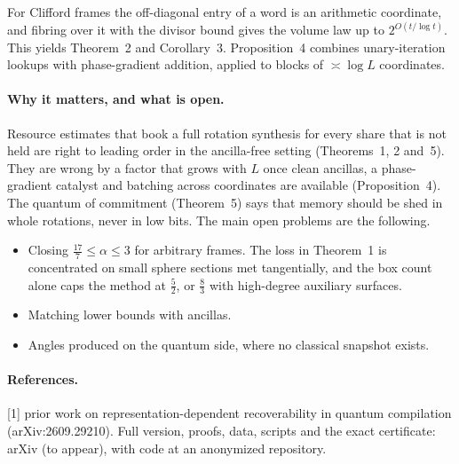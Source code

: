 \documentclass[11pt]{article}
\begin{document}
For Clifford frames the off-diagonal entry of a word is an arithmetic coordinate, and fibring over it with the divisor bound gives the volume law up to $2^{O(t/\log t)}$. This yields Theorem~2 and Corollary~3. Proposition~4 combines unary-iteration lookups with phase-gradient addition, applied to blocks of $\asymp\log L$ coordinates.

\paragraph{Why it matters, and what is open.} Resource estimates that book a full rotation synthesis for every share that is not held are right to leading order in the ancilla-free setting (Theorems~1, 2 and~5). They are wrong by a factor that grows with $L$ once clean ancillas, a phase-gradient catalyst and batching across coordinates are available (Proposition~4). The quantum of commitment (Theorem~5) says that memory should be shed in whole rotations, never in low bits. The main open problems are the following.
\begin{itemize}\setlength\itemsep{0pt}
\item Closing $\frac{17}7\le\alpha\le3$ for arbitrary frames. The loss in Theorem~1 is concentrated on small sphere sections met tangentially, and the box count alone caps the method at $\frac52$, or $\frac83$ with high-degree auxiliary surfaces.
\item Matching lower bounds with ancillas.
\item Angles produced on the quantum side, where no classical snapshot exists.
\end{itemize}

\vspace{-0.5em}
\paragraph{References.} [1] prior work on representation-dependent recoverability in quantum compilation (arXiv:2609.29210). Full version, proofs, data, scripts and the exact certificate: arXiv (to appear), with code at an anonymized repository.
\end{document}
